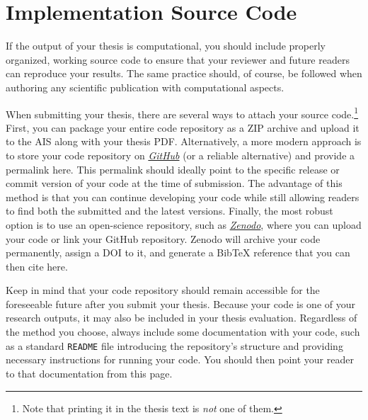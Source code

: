 \chapter{Implementation Source Code}
\label{ch:appendix.b}

If the output of your thesis is computational, you should include properly organized, working source code to ensure that
your reviewer and future readers can reproduce your results. The same practice should, of course, be followed when
authoring any scientific publication with computational aspects.

When submitting your thesis, there are several ways to attach your source code.\footnote{Note that printing it in the
thesis text is \emph{not} one of them.} First, you can package your entire code repository as a ZIP archive and
upload it to the AIS along with your thesis PDF. Alternatively, a more modern approach is to store your code repository
on \emph{\href{https://github.com/}{GitHub}} (or a reliable alternative) and provide a permalink here. This
permalink should ideally point to the specific release or commit version of your code at the time of submission.
The advantage of this method is that you can continue developing your code while still allowing readers to find both
the submitted and the latest versions. Finally, the most robust option is to use an open-science repository,
such as \emph{\href{https://zenodo.org/}{Zenodo}}, where you can upload your code or link your GitHub repository.
Zenodo will archive your code permanently, assign a DOI to it, and generate a Bib\TeX{} reference that you can then
cite here.

Keep in mind that your code repository should remain accessible for the foreseeable future after you submit your thesis.
Because your code is one of your research outputs, it may also be included in your thesis evaluation. Regardless of the
method you choose, always include some documentation with your code, such as a standard \verb|README|
file introducing the repository's structure and providing necessary instructions for running your code. You should then
point your reader to that documentation from this page.
